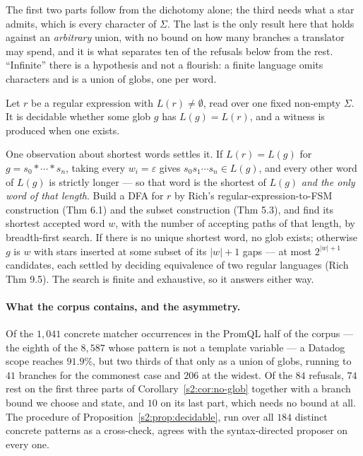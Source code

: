 \noindent
The first two parts follow from the dichotomy alone; the third needs what a star admits,
which is every character of $\Sigma$. The last is the only result here that holds against
an \emph{arbitrary} union, with no bound on how many branches a translator may spend, and
it is what separates ten of the refusals below from the rest. ``Infinite'' there is a
hypothesis and not a flourish: a finite language omits characters and is a union of globs,
one per word.

\begin{proposition}\label{s2:prop:decidable}
Let $r$ be a regular expression with $L(r)\neq\emptyset$, read over one fixed non-empty
$\Sigma$. It is decidable whether some glob $g$ has $L(g)=L(r)$, and a witness is produced
when one exists.
\end{proposition}

\noindent
One observation about shortest words settles it. If $L(r)=L(g)$ for $g=s_0*\cdots*s_n$,
taking every $w_i=\varepsilon$ gives $s_0s_1\cdots s_n\in L(g)$, and every other word of
$L(g)$ is strictly longer --- so that word is the shortest of $L(g)$ \emph{and the only
word of that length}. Build a DFA for $r$ by Rich's regular-expression-to-FSM construction
(Thm 6.1) and the subset construction (Thm 5.3), and find its shortest accepted word $w$,
with the number of accepting paths of that length, by breadth-first search. If there is no
unique shortest word, no glob exists; otherwise $g$ is $w$ with stars inserted at some
subset of its $|w|+1$ gaps --- at most $2^{|w|+1}$ candidates, each settled by deciding
equivalence of two regular languages (Rich Thm 9.5). The search is finite and exhaustive,
so it answers either way.

\paragraph{What the corpus contains, and the asymmetry.}
Of the $1{,}041$ concrete matcher occurrences in the PromQL half of the corpus --- the
eighth of the $8{,}587$ whose pattern is not a template variable --- a Datadog scope
reaches $91.9\%$, but two thirds of that only as a union of globs, running to $41$ branches
for the commonest case and $206$ at the widest. Of the $84$ refusals, $74$ rest on the
first three parts of Corollary~\ref{s2:cor:no-glob} together with a branch bound we choose
and state, and $10$ on its last part, which needs no bound at all. The procedure of
Proposition~\ref{s2:prop:decidable}, run over all $184$ distinct concrete patterns as a
cross-check, agrees with the syntax-directed proposer on every one.

